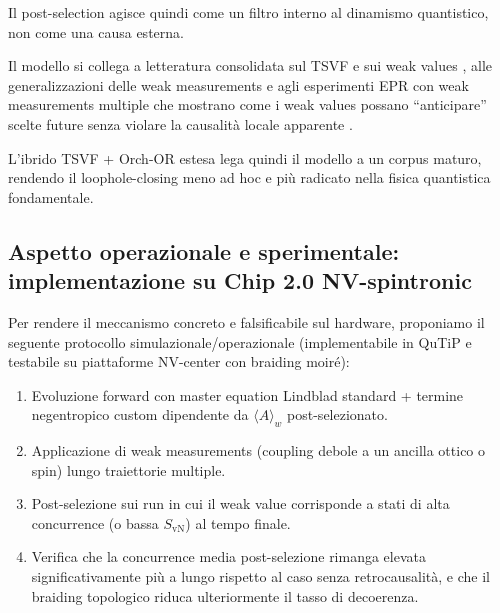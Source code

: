 \documentclass[11pt,a4paper]{article}
\let\oldcite\cite
\renewcommand{\cite}{\protect\oldcite}
\theoremstyle{plain}
\theoremstyle{definition}
\begin{document}
\vspace{0.3cm}



Il post-selection agisce quindi come un filtro interno al dinamismo quantistico, non come una causa esterna.


\vspace{0.3cm}

Il modello si collega a letteratura consolidata sul TSVF e sui weak values \cite{aharonov2001,vaidman2007}, alle generalizzazioni delle weak measurements \cite{oreshkov2005} e agli esperimenti EPR con weak measurements multiple che mostrano come i weak values possano ``anticipare'' scelte future senza violare la causalità locale apparente \cite{aharonov2015}.



\vspace{0.3cm}

L'ibrido TSVF + Orch-OR estesa lega quindi il modello a un corpus maturo, rendendo il loophole-closing meno ad hoc e più radicato nella fisica quantistica fondamentale.





\vspace{0.2cm}

\subsection{Aspetto operazionale e sperimentale: implementazione su Chip 2.0 NV-spintronic}

\vspace{0.2cm}

Per rendere il meccanismo concreto e falsificabile sul hardware, proponiamo il seguente protocollo simulazionale/operazionale (implementabile in QuTiP e testabile su piattaforme NV-center con braiding moiré):

\vspace{0.2cm}

\begin{enumerate}
    \item Evoluzione forward con master equation Lindblad standard + termine negentropico custom dipendente da \( \langle A \rangle_w \) post-selezionato.
    \item Applicazione di weak measurements (coupling debole a un ancilla ottico o spin) lungo traiettorie multiple.
    \item Post-selezione sui run in cui il weak value corrisponde a stati di alta concurrence (o bassa \( S_{\text{vN}} \)) al tempo finale.
    \item Verifica che la concurrence media post-selezione rimanga elevata significativamente più a lungo rispetto al caso senza retrocausalità, e che il braiding topologico riduca ulteriormente il tasso di decoerenza.
\end{enumerate}
\end{document}
